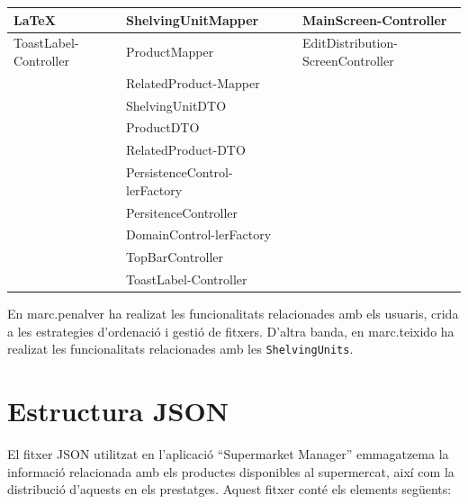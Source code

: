 \documentclass[a4paper,12pt]{report}
\begin{document}
\begin{itemize}
\begin{table}[H]
\begin{tabularx}{\textwidth}{|X|X|X|X|}
			\hline
			\LaTeX & ShelvingUnitMapper &                  &  MainScreen-\newline Controller               \\
			\hline
			ToastLabel-\newline Controller & ProductMapper &                  &     EditDistribution-\newline ScreenController            \\
			\hline
			& RelatedProduct-\newline Mapper&                  &                 \\
			\hline
			& ShelvingUnitDTO &                 &                 \\
			\hline
			& ProductDTO &                 &                 \\
			\hline
			& RelatedProduct-\newline DTO &                 &                 \\
			\hline
			& PersistenceControl-\newline lerFactory &                   &                 \\
			\hline
			& PersitenceController &                   &                 \\
			\hline
			& DomainControl-\newline  lerFactory &                  &                 \\
			\hline
			&TopBarController &                  &                 \\
			\hline
			&ToastLabel-\newline Controller &                  &                 \\
			\hline
		\end{tabularx}
	\end{table}

En marc.penalver ha realizat les funcionalitats relacionades amb els usuaris, crida a les estrategies d'ordenació i gestió de fitxers. D'altra banda, en marc.teixido ha realizat les funcionalitats relacionades amb les \texttt{ShelvingUnits}.

\section{Estructura JSON}

El fitxer JSON utilitzat en l'aplicació ``Supermarket Manager'' emmagatzema la informació relacionada amb els productes disponibles al supermercat, així com la distribució d'aquests en els prestatges. Aquest fitxer conté els elements següents:


\end{itemize}
\end{document}
